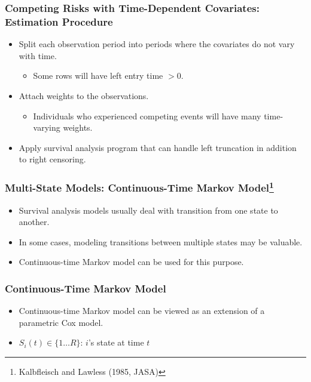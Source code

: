 \documentclass[14pt]{beamer}
\begin{document}
	\begin{frame}
	\frametitle{Competing Risks with Time-Dependent Covariates: Estimation Procedure}
	\begin{itemize}
	\item Split each observation period into periods where the covariates do not vary with time.
	\begin{itemize}
	\item Some rows will have left entry time $> 0$.
	\end{itemize}
	\item Attach weights to the observations.
	\begin{itemize}
	\item Individuals who experienced competing events will have many time-varying weights.
	\end{itemize}
	\item Apply survival analysis program that can handle left truncation in addition to right censoring.

	\end{itemize}

	\end{frame}

	\begin{frame}
	\frametitle{Multi-State Models: Continuous-Time Markov Model\footnote{Kalbfleisch and Lawless (1985, JASA)}}
	\begin{itemize}
	\item Survival analysis models usually deal with transition from one state to another.
	\item In some cases, modeling transitions between multiple states may be valuable.
	\item Continuous-time Markov model can be used for this purpose.
	\end{itemize}
	\end{frame}

	\begin{frame}
	\frametitle{Continuous-Time Markov Model}
	\begin{itemize}
	\item Continuous-time Markov model can be viewed as an extension of a parametric Cox model.
	\item $S_i(t) \in \{1 \dots R \}$: $i$'s state at time $t$

	\end{itemize}
	\end{frame}
\end{document}
